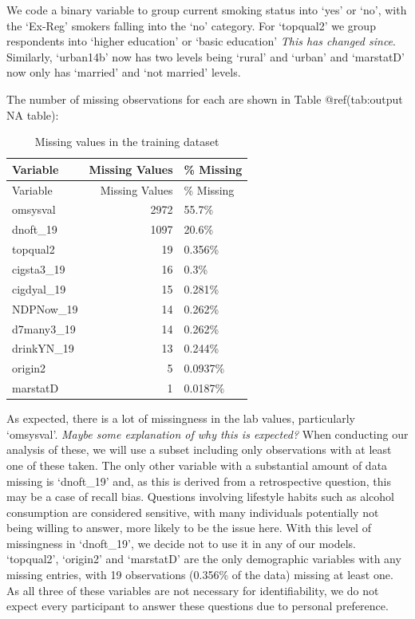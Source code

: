 \documentclass[
  11pt,
]{article}
\begin{document}
We code a binary variable to group current smoking status into `yes' or
`no', with the `Ex-Reg' smokers falling into the `no' category. For
`topqual2' we group respondents into `higher education' or `basic
education' \emph{This has changed since}. Similarly, `urban14b' now has
two levels being `rural' and `urban' and `marstatD' now only has
`married' and `not married' levels.

The number of missing observations for each are shown in Table
@ref(tab:output NA table):

\begin{longtable}[]{@{}lrl@{}}
\caption{Missing values in the training dataset}\tabularnewline
\toprule\noalign{}
Variable & Missing Values & \% Missing \\
\midrule\noalign{}
\endfirsthead
\toprule\noalign{}
Variable & Missing Values & \% Missing \\
\midrule\noalign{}
\endhead
\bottomrule\noalign{}
\endlastfoot
omsysval & 2972 & 55.7\% \\
dnoft\_19 & 1097 & 20.6\% \\
topqual2 & 19 & 0.356\% \\
cigsta3\_19 & 16 & 0.3\% \\
cigdyal\_19 & 15 & 0.281\% \\
NDPNow\_19 & 14 & 0.262\% \\
d7many3\_19 & 14 & 0.262\% \\
drinkYN\_19 & 13 & 0.244\% \\
origin2 & 5 & 0.0937\% \\
marstatD & 1 & 0.0187\% \\
\end{longtable}

As expected, there is a lot of missingness in the lab values,
particularly `omsysval'. \emph{Maybe some explanation of why this is
expected?} When conducting our analysis of these, we will use a subset
including only observations with at least one of these taken. The only
other variable with a substantial amount of data missing is `dnoft\_19'
and, as this is derived from a retrospective question, this may be a
case of recall bias. Questions involving lifestyle habits such as
alcohol consumption are considered sensitive, with many individuals
potentially not being willing to answer, more likely to be the issue
here. With this level of missingness in `dnoft\_19', we decide not to
use it in any of our models. `topqual2', `origin2' and `marstatD' are
the only demographic variables with any missing entries, with 19
observations (0.356\% of the data) missing at least one. As all three of
these variables are not necessary for identifiability, we do not expect
every participant to answer these questions due to personal preference.
\end{document}
